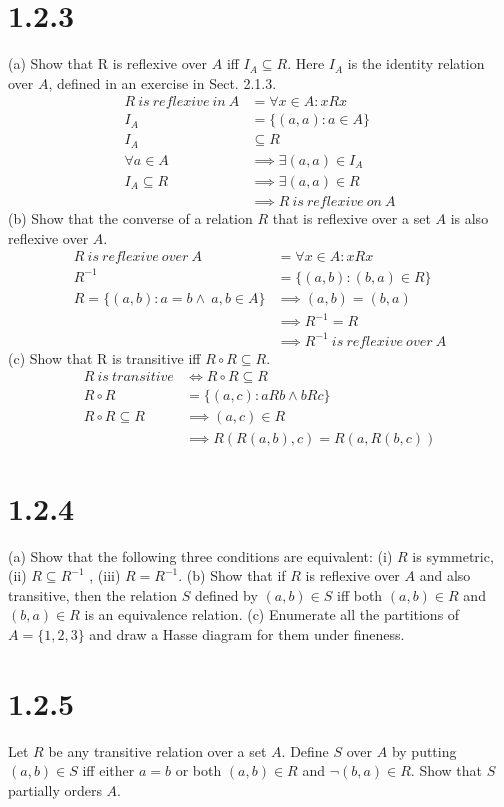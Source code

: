 \documentclass{article}
\begin{document}
\section*{1.2.3}
(a) Show that R is reflexive over $A$ iff $I_A \subseteq R$. Here $I_A$ is the identity relation over $A$, defined in an exercise in Sect. 2.1.3.
\begin{align*}
    R\ is\ reflexive\ in\ A &= \forall x \in A: xRx\\
    I_A &= \{(a,a): a \in A\}\\
    I_A &\subseteq R\\
    \forall a \in A &\implies \exists (a, a) \in I_A\\
    I_A \subseteq R &\implies \exists(a,a) \in R\\
    &\implies R\ is\ reflexive\ on\ A
\end{align*}
(b) Show that the converse of a relation $R$ that is reflexive over a set $A$ is also reflexive over $A$.
\begin{align*}
    R\ is\ reflexive\ over\ A &= \forall x \in A: xRx\\
    R^{-1} &= \{(a, b): (b, a) \in R\}\\
    R = \{(a, b): a = b \wedge\ a, b \in A\} &\implies (a, b) = (b, a)\\
    &\implies R^{-1} = R\\
    &\implies R^{-1}\ is\ reflexive\ over\ A
\end{align*}
(c) Show that R is transitive iff $R \circ R \subseteq R$.
 \begin{align*}
     R\ is\ transitive &\iff R \circ R \subseteq R\\
     R \circ R &= \{(a, c): aRb \wedge bRc\}\\
     R \circ R \subseteq R &\implies (a, c) \in R\\
     &\implies R(R(a,b), c) = R(a, R(b, c))
 \end{align*}
\section*{1.2.4}
(a) Show that the following three conditions are equivalent: (i) $R$ is symmetric, (ii) $R \subseteq R^{-1}$ , (iii) $R = R^{-1}$.
(b) Show that if $R$ is reflexive over $A$ and also transitive, then the relation $S$ defined by $(a,b) \in S$ iff both $(a,b) \in R$ and $(b,a) \in R$ is an equivalence relation.
(c) Enumerate all the partitions of $A=\{ 1, 2, 3 \}$ and draw a Hasse diagram for them under fineness.
\section*{1.2.5}
Let $R$ be any transitive relation over a set $A$. Define $S$ over $A$ by putting $(a,b) \in S$ iff either $a = b$ or both $(a,b) \in R$ and $\neg (b,a) \in R$. Show that $S$ partially orders $A$.
\end{document}
